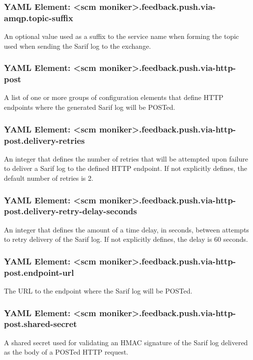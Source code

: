 \subsubsection{YAML Element: <scm moniker>.feedback.push.via-amqp.topic-suffix}\label{sec:yaml-push-via-amqp-topic-suffix}
An optional value used as a suffix to the service name when forming the topic used when sending the Sarif log to the exchange.

\subsubsection{YAML Element: <scm moniker>.feedback.push.via-http-post}\label{sec:yaml-push-via-http-post}
A list of one or more groups of configuration elements that define HTTP endpoints where the generated Sarif log will be POSTed.

\subsubsection{YAML Element: <scm moniker>.feedback.push.via-http-post.delivery-retries}\label{sec:yaml-push-via-http-post-delivery-retries}
An integer that defines the number of retries that will be attempted upon failure to deliver a Sarif log to the defined HTTP endpoint.  If not
explicitly defines, the default number of retries is 2.

\subsubsection{YAML Element: <scm moniker>.feedback.push.via-http-post.delivery-retry-delay-seconds}\label{sec:yaml-push-via-http-post-delivery-retry-delay-seconds}
An integer that defines the amount of a time delay, in seconds, between attempts to retry delivery of the Sarif log.  If not explicitly defines, the
delay is 60 seconds.

\subsubsection{YAML Element: <scm moniker>.feedback.push.via-http-post.endpoint-url}\label{sec:yaml-push-via-http-post-endpoint-url}
The URL to the endpoint where the Sarif log will be POSTed.


\subsubsection{YAML Element: <scm moniker>.feedback.push.via-http-post.shared-secret}\label{sec:yaml-push-via-http-post-shared-secret}
A shared secret used for validating an HMAC signature of the Sarif log delivered as the body of a POSTed HTTP request.


